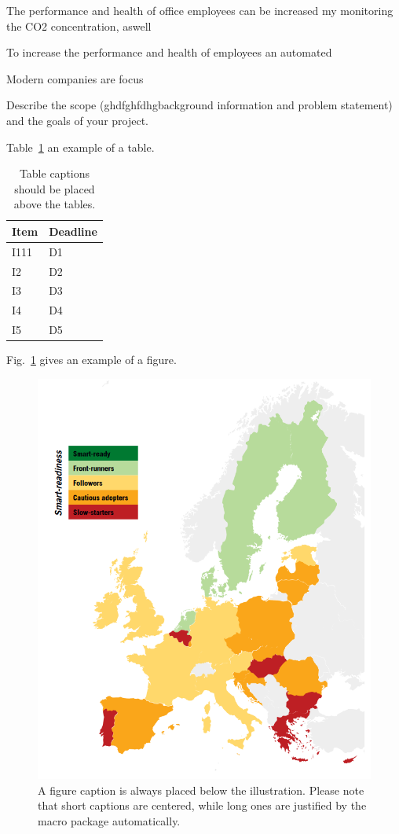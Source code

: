 \documentclass[runningheads]{llncs}
\begin{document}
The performance and health of office employees can be increased my monitoring the CO2 concentration, aswell   

To increase the performance and health of employees an automated  



Modern companies are focus




Describe the scope (ghdfghfdhgbackground information and problem statement) and the goals of your project.

Table~\ref{tab1} an example of a table.

\begin{table}
\caption{Table captions should be placed above the
tables.}\label{tab1}
\begin{tabular}{|l|l|}
\hline
Item & Deadline \\
\hline
I111 & D1 \\
I2 & D2 \\
I3 & D3 \\
I4 & D4 \\
I5 & D5 \\
\hline
\end{tabular}
\end{table}

Fig.~\ref{fig1} gives an example of a figure.

\begin{figure}
\includegraphics[width=\textwidth]{fig1}
\caption{A figure caption is always placed below the illustration.
Please note that short captions are centered, while long ones are
justified by the macro package automatically.} \label{fig1}
\end{figure}
\end{document}
